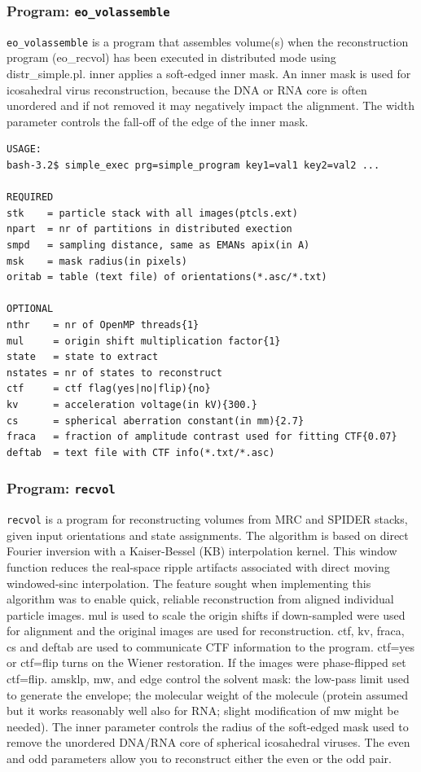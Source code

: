 \documentclass[a4paper,11pt]{article}
\newcommand{\prgname}[1]{\textcolor{NavyBlue}{\texttt{#1}}}
\begin{document}
\subsubsection{Program: \prgname{eo\_volassemble}}
\label{eo_volassemble}
\prgname{eo\_volassemble} is a program that assembles volume(s) when the reconstruction program (eo\_recvol) has been executed in distributed mode using distr\_simple.pl. inner applies a soft-edged inner mask. An inner mask is used for icosahedral virus reconstruction, because the DNA or RNA core is often unordered and  if not removed it may negatively impact the alignment. The width parameter controls the fall-off of the edge of the inner mask.

\begin{verbatim}
USAGE:
bash-3.2$ simple_exec prg=simple_program key1=val1 key2=val2 ...

REQUIRED
stk    = particle stack with all images(ptcls.ext)
npart  = nr of partitions in distributed exection
smpd   = sampling distance, same as EMANs apix(in A)
msk    = mask radius(in pixels)
oritab = table (text file) of orientations(*.asc/*.txt)

OPTIONAL
nthr    = nr of OpenMP threads{1}
mul     = origin shift multiplication factor{1}
state   = state to extract
nstates = nr of states to reconstruct
ctf     = ctf flag(yes|no|flip){no}
kv      = acceleration voltage(in kV){300.}
cs      = spherical aberration constant(in mm){2.7}
fraca   = fraction of amplitude contrast used for fitting CTF{0.07}
deftab  = text file with CTF info(*.txt/*.asc)
\end{verbatim}

\subsubsection{Program: \prgname{recvol}}
\label{recvol}
\prgname{recvol} is a program for reconstructing volumes from MRC and SPIDER stacks, given input orientations and state assignments. The algorithm is based on direct Fourier inversion with a Kaiser-Bessel (KB) interpolation kernel. This window function reduces the real-space ripple artifacts associated with direct moving windowed-sinc interpolation. The feature sought when implementing this algorithm was to enable quick, reliable reconstruction from aligned individual particle images. mul is used to scale the origin shifts if down-sampled were used for alignment and the original images are used for reconstruction. ctf, kv, fraca, cs and deftab are used to communicate CTF information to the program. ctf=yes or ctf=flip turns on the Wiener restoration. If the images were phase-flipped set ctf=flip. amsklp, mw, and edge control the solvent mask: the low-pass limit used to generate the envelope; the molecular weight of the molecule (protein assumed but it works reasonably well also for RNA; slight modification of mw might be needed). The inner parameter controls the radius of the soft-edged mask used to remove the unordered DNA/RNA core of spherical icosahedral viruses. The even and odd parameters allow you to reconstruct either the even or the odd pair.
\end{document}
